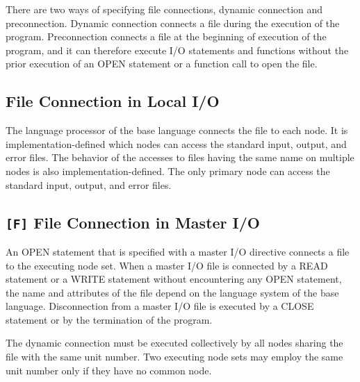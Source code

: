   There are two ways of specifying file connections, dynamic connection and
  preconnection.
  Dynamic connection connects a file during the execution of the program.
  Preconnection connects a file at the beginning of execution of the
  program, and it can therefore execute I/O statements and functions
  without the prior execution of an OPEN statement or a function call to
  open the file.

  \subsection{File Connection in Local I/O}

  The language processor of the base language connects the file to each
  node.
  It is implementation-defined which nodes can access the standard
  input, output, and error files.
  The behavior of the accesses to files having
  the same name on multiple nodes is also implementation-defined.
  The only primary node can access the standard input, output, and error
  files.
  


  \subsection{{\tt [F]} File Connection in Master I/O}

  An OPEN statement that is specified with a master I/O directive connects a
  file to the executing node set.
  When a master I/O file is connected by a READ statement or a WRITE
  statement without encountering any OPEN statement, the name and
  attributes of the file depend on the language system of the base
  language.
  Disconnection from a master I/O file is executed by a CLOSE statement
  or by the termination of the program.

  The dynamic connection must be executed collectively by all nodes sharing
  the file with the same unit number.
  Two executing node sets may employ the same unit number only if they
  have no common node.

